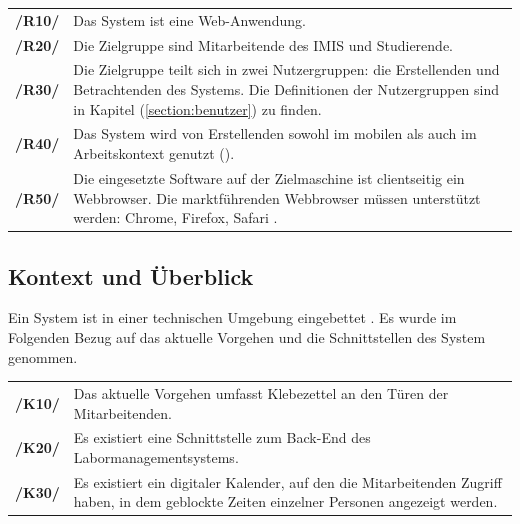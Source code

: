 \begin{center}
        \renewcommand{\arraystretch}{1.5}
        \begin{tabular}{p{}p{}}
                \hline
                \textbf{/R10/} & Das System ist eine Web-Anwendung.                                                        \\
                \textbf{/R20/} & Die Zielgruppe sind Mitarbeitende des IMIS und Studierende.                               \\
                \textbf{/R30/} & Die Zielgruppe teilt sich in zwei Nutzergruppen: die Erstellenden und
                Betrachtenden des Systems. Die Definitionen der Nutzergruppen sind in Kapitel (\ref{section:benutzer})
                zu finden.                                                                                                 \\
                \textbf{/R40/} & Das System wird von Erstellenden sowohl im mobilen als auch im Arbeitskontext genutzt (). \\
                \textbf{/R50/} & Die eingesetzte Software auf der Zielmaschine ist clientseitig ein
                Webbrowser. Die marktführenden Webbrowser müssen unterstützt werden: Chrome, Firefox,
                Safari \cite{noauthor_browser_nodate}.                                                                     \\
                \hline
        \end{tabular}
\end{center}

\subsection*{Kontext und Überblick}
\label{section:kontextueberblick}
Ein System ist in einer technischen Umgebung eingebettet \cite{balzert2009}. Es wurde im Folgenden Bezug auf das aktuelle Vorgehen und die Schnittstellen des System genommen.

\begin{center}
        \renewcommand{\arraystretch}{1.5}
        \begin{tabular}{p{}p{}}
                \hline
                \textbf{/K10/} & Das aktuelle Vorgehen umfasst Klebezettel an den Türen der Mitarbeitenden.                                                                  \\
                \textbf{/K20/} & Es existiert eine Schnittstelle zum Back-End des Labormanagementsystems.                                                                    \\
                \textbf{/K30/} & Es existiert ein digitaler Kalender, auf den die Mitarbeitenden Zugriff haben, in dem geblockte Zeiten einzelner Personen angezeigt werden. \\
                \hline
        \end{tabular}
\end{center}


